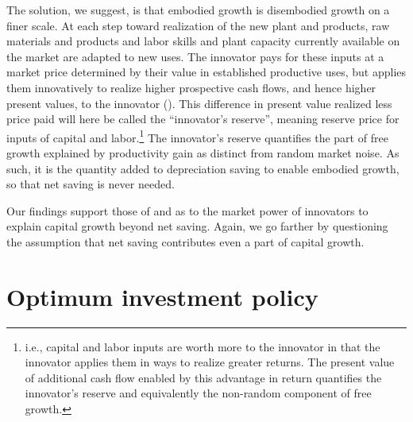 \documentclass[a4paper,fleqn]{latex_styles/cas-sc}
\begin{document}
The solution, we suggest, is that embodied growth is disembodied growth
on a finer scale. At each step toward realization of the new plant and
products, raw materials and products and labor skills and plant capacity
currently available on the market are adapted to new uses. The innovator
pays for these inputs at a market price determined by their value in
established productive uses, but applies them innovatively to realize
higher prospective cash flows, and hence higher present values, to the
innovator
(\citet{marshallPrinciplesEconomics1890, schumpeterTheoryEconomicDevelopment1934}).
This difference in present value realized less price paid will here be
called the ``innovator's reserve'', meaning reserve price for inputs of
capital and labor.\footnote{i.e., capital and labor inputs are worth
  more to the innovator in that the innovator applies them in ways to
  realize greater returns. The present value of additional cash flow
  enabled by this advantage in return quantifies the innovator's reserve
  and equivalently the non-random component of free growth.} The innovator's reserve quantifies the
part of free growth explained by productivity gain as distinct from
random market noise. As such, it is the quantity added to depreciation
saving to enable embodied growth, so that net saving is never
needed.

Our findings support those of \cite{picketyCapitalIsBack2014} and \cite{kurz2023market} as to the market power of innovators to explain capital growth beyond net saving. Again, we go farther by questioning the assumption that net saving contributes even a part of capital growth.

\hypertarget{optimum-investment-policy}{%
\section{Optimum investment policy}\label{optimum-investment-policy}}
\end{document}
